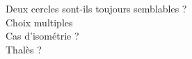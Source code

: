 %
%
 Deux cercles sont-ils toujours semblables ?\\

 Choix multiples\\
 Cas d'isométrie ?\\
 Thalès ?\\
